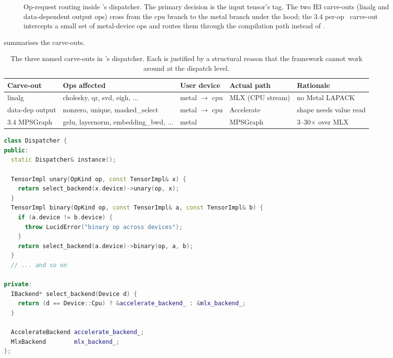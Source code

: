 \begin{figure}[t]
\begin{adjustbox}{max width=\textwidth, center}
\end{adjustbox}
\caption[Dispatcher routing.]{Op-request routing inside
\Lucid's dispatcher. The primary decision is the input tensor's
 tag. The two H3 carve-outs (linalg and
data-dependent output ops) cross from the cpu branch to the metal
branch under the hood; the 3.4 per-op \MPSGraph\ carve-out
intercepts a small set of metal-device ops and routes them through
the  compilation path instead of \MLX.}
\label{fig:backend_dispatch:routing}
\end{figure}

 summarises the carve-outs.

\begin{table}[t]
\centering
\footnotesize
\setlength{\tabcolsep}{4pt}
\begin{adjustbox}{max width=\textwidth, center}
\begin{tabular}{lllll}
\toprule
Carve-out & Ops affected & User device & Actual path & Rationale \\
\midrule
linalg          & cholesky, qr, svd, eigh, ... & metal $\to$ cpu & MLX (CPU stream) & no Metal LAPACK \\
data-dep output & nonzero, unique, masked\_select & metal $\to$ cpu & Accelerate & shape needs value read \\
3.4 MPSGraph    & gelu, layernorm, embedding\_bwd, ... & metal & MPSGraph & 3--30$\times$ over MLX \\
\bottomrule
\end{tabular}
\end{adjustbox}
\caption[Dispatcher carve-outs.]{The three named carve-outs in
\Lucid's dispatcher. Each is justified by a structural reason
that the framework cannot work around at the dispatch level.}
\label{tab:backend_dispatch:carveouts}
\end{table}

\begin{lstlisting}[style=lucidcpp,language=C++]
class Dispatcher {
public:
  static Dispatcher& instance();

  TensorImpl unary(OpKind op, const TensorImpl& x) {
    return select_backend(x.device)->unary(op, x);
  }
  TensorImpl binary(OpKind op, const TensorImpl& a, const TensorImpl& b) {
    if (a.device != b.device) {
      throw LucidError("binary op across devices");
    }
    return select_backend(a.device)->binary(op, a, b);
  }
  // ... and so on

private:
  IBackend* select_backend(Device d) {
    return (d == Device::Cpu) ? &accelerate_backend_ : &mlx_backend_;
  }

  AccelerateBackend accelerate_backend_;
  MlxBackend        mlx_backend_;
};
\end{lstlisting}

